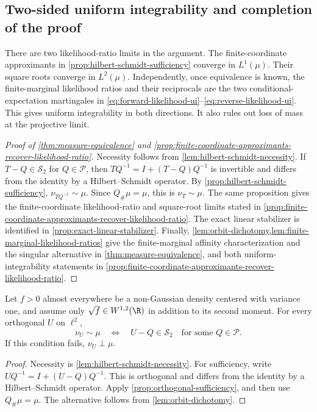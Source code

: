 \subsection{Two-sided uniform integrability and completion of the proof}
\label{sec:likelihood-convergence}

There are two likelihood-ratio limits in the argument.
The finite-coordinate approximants in \cref{prop:hilbert-schmidt-sufficiency} converge in
\(L^1(\mu)\).
Their square roots converge in \(L^2(\mu)\).
Independently, once equivalence is known, the finite-marginal likelihood ratios and
their reciprocals are the two conditional-expectation martingales in
\eqref{eq:forward-likelihood-ui}--\eqref{eq:reverse-likelihood-ui}.
This gives uniform integrability in both directions.
It also rules out loss of mass at the projective limit.

\begin{proof}[Proof of \cref{thm:measure-equivalence} and \cref{prop:finite-coordinate-approximants-recover-likelihood-ratio}]
Necessity follows from \cref{lem:hilbert-schmidt-necessity}.  If
$T-Q\in\mathcal S_2$ for $Q\in\mathcal P$, then
$TQ^{-1}=I+(T-Q)Q^{-1}$ is invertible and differs from the identity
by a Hilbert--Schmidt operator.  By \cref{prop:hilbert-schmidt-sufficiency},
$\nu_{TQ^{-1}}\sim\mu$.  Since $Q_\#\mu=\mu$, this is
$\nu_T\sim\mu$.  The same proposition gives the finite-coordinate
likelihood-ratio and square-root limits stated in
\cref{prop:finite-coordinate-approximants-recover-likelihood-ratio}.
The exact linear stabilizer is identified in \cref{prop:exact-linear-stabilizer}.
Finally, \cref{lem:orbit-dichotomy,lem:finite-marginal-likelihood-ratios}
give the finite-marginal affinity characterization and the singular
alternative in \cref{thm:measure-equivalence}, and both
uniform-integrability statements in
\cref{prop:finite-coordinate-approximants-recover-likelihood-ratio}.
\end{proof}
\begin{theorem}
\label{thm:orthogonal-equivalence}
Let $f>0$ almost everywhere be a non-Gaussian density centered with
variance one, and assume only $\sqrt f\in W^{1,2}(\R)$ in addition
to its second moment.  For every orthogonal $U$ on $\ell^2$,
\[
 \nu_U\sim\mu
 \quad\Longleftrightarrow\quad
 U-Q\in\mathcal S_2
 \quad\text{for some }Q\in\mathcal P.
\]
If this condition fails, $\nu_U\perp\mu$.
\end{theorem}
\begin{proof}
Necessity is \cref{lem:hilbert-schmidt-necessity}.  For sufficiency, write
$UQ^{-1}=I+(U-Q)Q^{-1}$.  This is orthogonal and differs from the
identity by a Hilbert--Schmidt operator.  Apply
\cref{prop:orthogonal-sufficiency}, and then use
$Q_\#\mu=\mu$.  The alternative follows from
\cref{lem:orbit-dichotomy}.
\end{proof}

